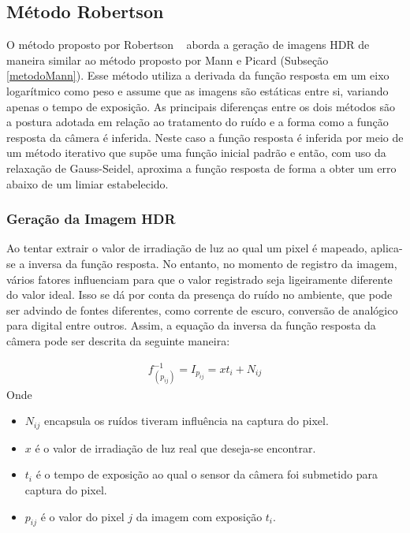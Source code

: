 \subsection{Método Robertson} \label{metodoRobertson}

O método proposto por Robertson \etal~\cite{robertson} aborda a geração de imagens HDR de maneira similar ao método proposto por Mann e Picard (Subseção \ref{metodoMann}). Esse método utiliza a derivada da função resposta em um eixo logarítmico como peso e assume que as imagens são estáticas entre si, variando apenas o tempo de exposição. As principais diferenças entre os dois métodos são a postura adotada em relação ao tratamento do ruído e a forma como a função resposta da câmera é inferida. Neste caso a função resposta é inferida por meio de um método iterativo que supõe uma função inicial padrão e então, com uso da relaxação de Gauss-Seidel, aproxima a função resposta de forma a obter um erro abaixo de um limiar estabelecido.

\subsubsection{Geração da Imagem HDR} \label{metodoRobertsonGeracao}

Ao tentar extrair o valor de irradiação de luz ao qual um pixel é mapeado, aplica-se a inversa da função resposta. No entanto, no momento de registro da imagem, vários fatores influenciam para que o valor registrado seja ligeiramente diferente do valor ideal. Isso se dá por conta da presença do ruído no ambiente, que pode ser advindo de fontes diferentes, como corrente de escuro, conversão de analógico para digital entre outros. Assim, a equação da inversa da função resposta da câmera pode ser descrita da seguinte maneira:

\begin{align} \label{eqRobertsonIFR}
	f_{(p_{ij})}^{-1} = I_{p_{ij}} = xt_{i} + N_{ij}
\end{align}
Onde
\begin{itemize}
\item $N_{ij}$ encapsula os ruídos tiveram influência na captura do pixel.
\item $x$ é o valor de irradiação de luz real que deseja-se encontrar.
\item $t_{i}$ é o tempo de exposição ao qual o sensor da câmera foi submetido para captura do pixel.
\item $p_{ij}$ é o valor do pixel $j$ da imagem com exposição $t_{i}$.
\end{itemize}

